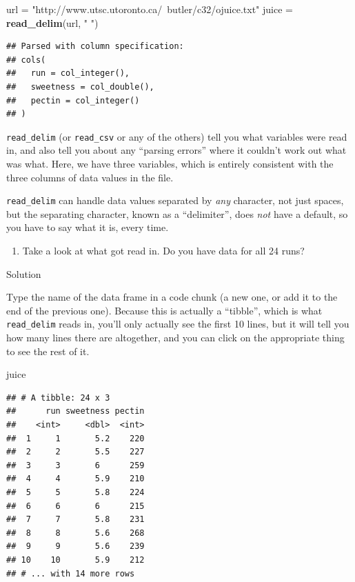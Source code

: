 \documentclass[]{tufte-book}
\newenvironment{Shaded}{}{}
\newcommand{\KeywordTok}[1]{\textcolor[rgb]{0.00,0.44,0.13}{\textbf{#1}}}
\newcommand{\NormalTok}[1]{#1}
\newcommand{\StringTok}[1]{\textcolor[rgb]{0.25,0.44,0.63}{#1}}
\providecommand{\tightlist}{%
  \setlength{\itemsep}{0pt}\setlength{\parskip}{0pt}}
\theoremstyle{definition}
\theoremstyle{definition}
\theoremstyle{definition}
\theoremstyle{remark}
\begin{document}
\begin{Shaded}
\begin{Highlighting}[]
\NormalTok{url =}\StringTok{ "http://www.utsc.utoronto.ca/~butler/c32/ojuice.txt"}
\NormalTok{juice =}\StringTok{ }\KeywordTok{read_delim}\NormalTok{(url, }\StringTok{" "}\NormalTok{)}
\end{Highlighting}
\end{Shaded}

\begin{verbatim}
## Parsed with column specification:
## cols(
##   run = col_integer(),
##   sweetness = col_double(),
##   pectin = col_integer()
## )
\end{verbatim}

\texttt{read\_delim} (or \texttt{read\_csv} or any of the others) tell
you what variables were read in, and also tell you about any ``parsing
errors'' where it couldn't work out what was what. Here, we have three
variables, which is entirely consistent with the three columns of data
values in the file.

\texttt{read\_delim} can handle data values separated by \emph{any}
character, not just spaces, but the separating character, known as a
``delimiter'', does \emph{not} have a default, so you have to say what
it is, every time.

\begin{enumerate}
\def\labelenumi{(\alph{enumi})}
\setcounter{enumi}{1}
\tightlist
\item
  Take a look at what got read in. Do you have data for all 24 runs?
\end{enumerate}

Solution

Type the name of the data frame in a code chunk (a new one, or add it to
the end of the previous one). Because this is actually a ``tibble'',
which is what \texttt{read\_delim} reads in, you'll only actually see
the first 10 lines, but it will tell you how many lines there are
altogether, and you can click on the appropriate thing to see the rest
of it.

\begin{Shaded}
\begin{Highlighting}[]
\NormalTok{juice}
\end{Highlighting}
\end{Shaded}

\begin{verbatim}
## # A tibble: 24 x 3
##      run sweetness pectin
##    <int>     <dbl>  <int>
##  1     1       5.2    220
##  2     2       5.5    227
##  3     3       6      259
##  4     4       5.9    210
##  5     5       5.8    224
##  6     6       6      215
##  7     7       5.8    231
##  8     8       5.6    268
##  9     9       5.6    239
## 10    10       5.9    212
## # ... with 14 more rows
\end{verbatim}
\end{document}
